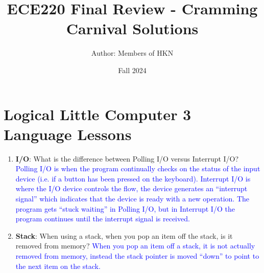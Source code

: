 \documentclass{article}
\title{ECE220 Final Review - Cramming Carnival Solutions}
\author{Author: Members of HKN}
\date{Fall 2024}
\begin{document}
\maketitle

\section{
Logical Little Computer 3 Language Lessons}
\begin{enumerate}[label=(\alph*)]
    \item \textbf{I/O}: What is the difference between Polling I/O versus Interrupt I/O?
    \newline\textcolor{blue}{
    Polling I/O is when the program continually checks on the status of the input device (i.e. if a button has been pressed on the keyboard). Interrupt I/O is where the I/O device controls the flow, the device generates an “interrupt signal” which indicates that the device is ready with a new operation. The program gets “stuck waiting” in Polling I/O, but in Interrupt I/O the program continues until the interrupt signal is received.}

    \item \textbf{Stack}: When using a stack, when you pop an item off the stack, is it removed from memory?
    \newline\textcolor{blue}{When you pop an item off a stack, it is not actually removed from memory, instead the stack pointer is moved “down” to point to the next item on the stack.}
    

\end{enumerate}
\end{document}
